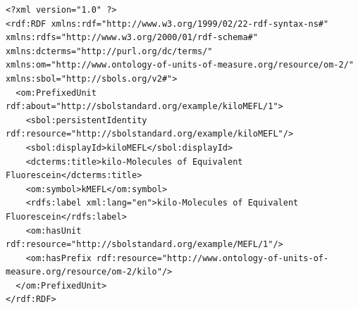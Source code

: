 \begin{lstlisting}
<?xml version="1.0" ?>
<rdf:RDF xmlns:rdf="http://www.w3.org/1999/02/22-rdf-syntax-ns#" xmlns:rdfs="http://www.w3.org/2000/01/rdf-schema#" xmlns:dcterms="http://purl.org/dc/terms/" xmlns:om="http://www.ontology-of-units-of-measure.org/resource/om-2/" xmlns:sbol="http://sbols.org/v2#">
  <om:PrefixedUnit rdf:about="http://sbolstandard.org/example/kiloMEFL/1">
    <sbol:persistentIdentity rdf:resource="http://sbolstandard.org/example/kiloMEFL"/>
    <sbol:displayId>kiloMEFL</sbol:displayId>
    <dcterms:title>kilo-Molecules of Equivalent Fluorescein</dcterms:title>
    <om:symbol>kMEFL</om:symbol>
    <rdfs:label xml:lang="en">kilo-Molecules of Equivalent Fluorescein</rdfs:label>
    <om:hasUnit rdf:resource="http://sbolstandard.org/example/MEFL/1"/>
    <om:hasPrefix rdf:resource="http://www.ontology-of-units-of-measure.org/resource/om-2/kilo"/>
  </om:PrefixedUnit>
</rdf:RDF>
\end{lstlisting}
\label{ser:PrefixedUnit}

